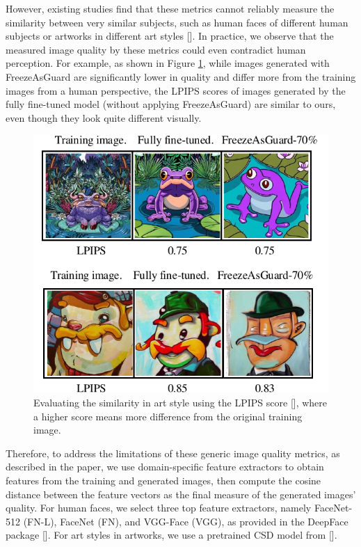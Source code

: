 \documentclass{article}
\begin{document}
However, existing studies find that these metrics cannot reliably measure the similarity between very similar subjects, such as human faces of different human subjects or artworks in different art styles []. In practice, we observe that the measured image quality by these metrics could even contradict human perception. For example, as shown in Figure \ref{fig:lpips}, while images generated with FreezeAsGuard are significantly lower in quality and differ more from the training images from a human perspective, the LPIPS scores of images generated by the fully fine-tuned model (without applying FreezeAsGuard) are similar to ours, even though they look quite different visually. 

\begin{figure}[h]
	\centering
	\vspace{-0.05in}
	\includegraphics[width=0.8\linewidth]{figures/LPIPS_example.pdf}
	\caption{Evaluating the similarity in art style using the LPIPS score [], where a higher score means more difference from the original training image.}
	\label{fig:lpips}
\end{figure}

Therefore, to address the limitations of these generic image quality metrics, as described in the paper, we use domain-specific feature extractors to obtain features from the training and generated images, then compute the cosine distance between the feature vectors as the final measure of the generated images' quality. For human faces, we select three top feature extractors, namely FaceNet-512 (FN-L), FaceNet (FN), and VGG-Face (VGG), as provided in the DeepFace package []. For art styles in artworks, we use a pretrained CSD model from [].
\end{document}
